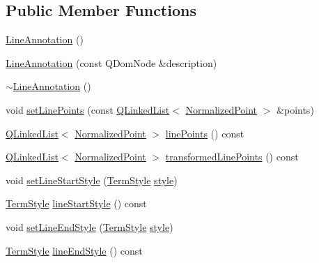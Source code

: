 \subsection*{Public Member Functions}
\begin{DoxyCompactItemize}
\item 
\hyperlink{classOkular_1_1LineAnnotation_ad99994440f4b96589090dc693fe318bf}{Line\+Annotation} ()
\item 
\hyperlink{classOkular_1_1LineAnnotation_a1aea8879a8238612cd271b89617fd57f}{Line\+Annotation} (const Q\+Dom\+Node \&description)
\item 
\hyperlink{classOkular_1_1LineAnnotation_aa24f49158e9fad0e2251491ba7e988d4}{$\sim$\+Line\+Annotation} ()
\item 
void \hyperlink{classOkular_1_1LineAnnotation_a8d55187d06930ee5abe8cb0737826b9e}{set\+Line\+Points} (const \hyperlink{classQLinkedList}{Q\+Linked\+List}$<$ \hyperlink{classOkular_1_1NormalizedPoint}{Normalized\+Point} $>$ \&points)
\item 
\hyperlink{classQLinkedList}{Q\+Linked\+List}$<$ \hyperlink{classOkular_1_1NormalizedPoint}{Normalized\+Point} $>$ \hyperlink{classOkular_1_1LineAnnotation_a93369ba26234da72308372df8e6c3a77}{line\+Points} () const 
\item 
\hyperlink{classQLinkedList}{Q\+Linked\+List}$<$ \hyperlink{classOkular_1_1NormalizedPoint}{Normalized\+Point} $>$ \hyperlink{classOkular_1_1LineAnnotation_a1e3b104d9572967e66f35a15c335f37c}{transformed\+Line\+Points} () const 
\item 
void \hyperlink{classOkular_1_1LineAnnotation_ad788328665cdd6a36afc7e26b257a598}{set\+Line\+Start\+Style} (\hyperlink{classOkular_1_1LineAnnotation_a67e1128311347eabfd909909facabec6}{Term\+Style} \hyperlink{classOkular_1_1Annotation_ae1f845ddbd6d524b2b388c6c9ef26423}{style})
\item 
\hyperlink{classOkular_1_1LineAnnotation_a67e1128311347eabfd909909facabec6}{Term\+Style} \hyperlink{classOkular_1_1LineAnnotation_add76ac33e76e45cc54ed0ee6d5903a67}{line\+Start\+Style} () const 
\item 
void \hyperlink{classOkular_1_1LineAnnotation_a2f7206dfc6e995329856a4f3db6fa97e}{set\+Line\+End\+Style} (\hyperlink{classOkular_1_1LineAnnotation_a67e1128311347eabfd909909facabec6}{Term\+Style} \hyperlink{classOkular_1_1Annotation_ae1f845ddbd6d524b2b388c6c9ef26423}{style})
\item 
\hyperlink{classOkular_1_1LineAnnotation_a67e1128311347eabfd909909facabec6}{Term\+Style} \hyperlink{classOkular_1_1LineAnnotation_a789669b1ca2c9dcbe1d67eaac7e87ee7}{line\+End\+Style} () const 

\end{DoxyCompactItemize}
